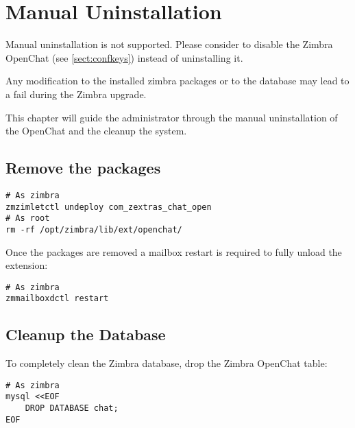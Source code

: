 \section{Manual Uninstallation}

\begin{comment}
WARNING:
\end{comment}
\begin{warning}
    Manual uninstallation is not supported.
    Please consider to disable the Zimbra OpenChat (see \autoref{sect:confkeys}) instead of uninstalling it.

    Any modification to the installed zimbra packages or to the database may lead to a fail during the Zimbra upgrade.
\end{warning}

This chapter will guide the administrator through the manual uninstallation of the OpenChat and
the cleanup the system.

\subsection{Remove the packages}
    \begin{verbatim}
# As zimbra
zmzimletctl undeploy com_zextras_chat_open
# As root
rm -rf /opt/zimbra/lib/ext/openchat/
    \end{verbatim}

    Once the packages are removed a mailbox restart is required to fully unload the extension:
    \begin{verbatim}
# As zimbra
zmmailboxdctl restart
    \end{verbatim}

\subsection{Cleanup the Database}
    To completely clean the Zimbra database, drop the Zimbra OpenChat table:
    \begin{verbatim}
# As zimbra
mysql <<EOF
    DROP DATABASE chat;
EOF
    \end{verbatim}

